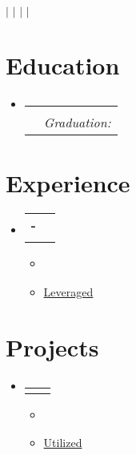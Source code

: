 \documentclass[letterpaper,11pt]{article}
\makeatletter
\newcommand{\resumeItem}[1]{
  \item\small{
    {#1 \vspace{-2pt}}
  }
}
\newcommand{\resumeSubheading}[4]{
  \vspace{-2pt}\item
    \begin{tabular*}{0.97\textwidth}[t]{l@{\extracolsep{\fill}}r}
      \textbf{#1} & #2 \\
      \textit{\small#3} & \textit{\small #4} \\
    \end{tabular*}\vspace{-7pt}
}
\newcommand{\resumeProjectHeading}[2]{
    \item
    \begin{tabular*}{0.97\textwidth}{l@{\extracolsep{\fill}}r}
      \small#1 & #2 \\
    \end{tabular*}\vspace{-7pt}
}
\newcommand{\resumeSubHeadingListStart}{\begin{itemize}[leftmargin=0.15in, label={}]}
\newcommand{\resumeSubHeadingListEnd}{\end{itemize}}
\newcommand{\resumeItemListStart}{\begin{itemize}}
\newcommand{\resumeItemListEnd}{\end{itemize}\vspace{-5pt}}
\makeatother
\begin{document}

\begin{center}
    \textbf{\Huge \scshape {}} \\ \vspace{1pt}
    \small {} $|$ \href{mailto:\VAR{contact.email}}{\ul{}} $|$
    \href{https://\VAR{contact.linkedin}}{} $|$
    \href{https://\VAR{contact.github}}{} $|$
    \href{https://\VAR{contact.gitlab}}{}
\end{center}


\section{Education}
  \resumeSubHeadingListStart
    \resumeSubheading
      {\VAR{school.name}}{\VAR{school.location}}
      {\VAR{school.description}}{Graduation: \VAR{school.graduation}}
  \resumeSubHeadingListEnd


\section{Experience}
  \resumeSubHeadingListStart

    \resumeSubheading
      {\VAR{job.employer} - \VAR{job.title}}{\VAR{job.duration}}
      {\VAR{job.location}}{}
      \resumeItemListStart
        \resumeItem{}
        \resumeItem{\ul{Leveraged} }
      \resumeItemListEnd
      
  \resumeSubHeadingListEnd


\section{Projects}
    \resumeSubHeadingListStart
      \resumeProjectHeading
          {\href{\VAR{project.url}}{\textbf{\VAR{project.name}}}}
          {\VAR{project.duration}}
          \resumeItemListStart
            \resumeItem{}
            \resumeItem{\ul{Utilized} }
          \resumeItemListEnd
    \resumeSubHeadingListEnd
\end{document}
